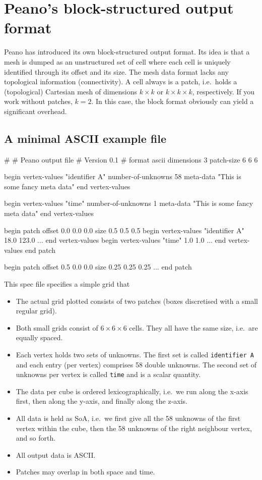 \chapter{Peano's block-structured output format}


Peano has introduced its own block-structured output format.
Its idea is that a mesh is dumped as an unstructured set of cell where each cell
is uniquely identified through its offset and its size. 
The mesh data format lacks any topological information (connectivity).
A cell always is a patch, i.e.~holds a (topological) Cartesian mesh of
dimensions $k \times k$ or $k \times k \times k $, respectively.
If you work without patches, $k=2$. 
In this case, the block format obviously can yield a significant overhead.



\section{A minimal ASCII example file}
\begin{code}
#
# Peano output file
# Version 0.1
#
format ascii
dimensions 3
patch-size 6 6 6

begin vertex-values "identifier A"
  number-of-unknowns 58
  meta-data "This is some fancy meta data"  
end vertex-values

begin vertex-values "time"
  number-of-unknowns 1
  meta-data "This is some fancy meta data"  
end vertex-values

begin patch
  offset 0.0 0.0 0.0
  size   0.5 0.5 0.5
  begin vertex-values "identifier A"
    18.0 123.0 ...
  end vertex-values
  begin vertex-values "time"
    1.0 1.0 ...
  end vertex-values
end patch 

begin patch
  offset 0.5 0.0 0.0
  size   0.25 0.25 0.25
  ...
end patch 
\end{code}

\noindent
This spec file specifies a simple grid that

\begin{itemize}
  \item The actual grid plotted consists of two patches (boxes discretised with
  a small regular grid).
  \item Both small grids consist of $6 \times 6 \times 6$ cells. They all have
  the same size, i.e.~are equally spaced. 
  \item Each vertex holds two sets of unknowns. The first set is called
  \texttt{identifier A} and each entry (per vertex) comprises 58 double
  unknowns. The second set of unknowns per vertex is called \texttt{time} and is
  a scalar quantity.
  \item The data per cube is ordered lexicographically, i.e.~we run along the
  x-axis first, then along the y-axis, and finally along the z-axis. 
  \item All data is held as SoA, i.e.~we first give all the 58 unknowns of the
  first vertex within the cube, then the 58 unknowns of the right neighbour
  vertex, and so forth.
  \item All output data is ASCII.
  \item Patches may overlap in both space and time.
\end{itemize}


